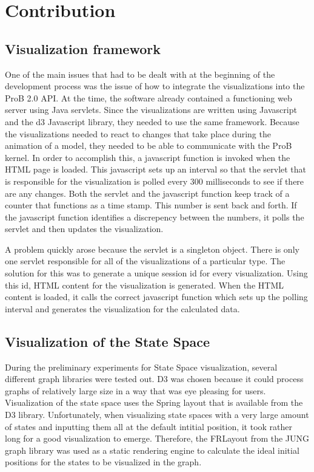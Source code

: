 \section{Contribution}

\subsection{Visualization framework}

One of the main issues that had to be dealt with at the beginning of the development process was the issue of how to integrate the visualizations into the ProB 2.0 API. At the time, the software already contained a functioning web server using Java servlets. Since the visualizations are written using Javascript and the d3 Javascript library, they needed to use the same framework. Because the visualizations needed to react to changes that take place during the animation of a model, they needed to be able to communicate with the ProB kernel. In order to accomplish this, a javascript function is invoked when the HTML page is loaded. This javascript sets up an interval so that the servlet that is responsible for the visualization is polled every 300 milliseconds to see if there are any changes. Both the servlet and the javascript function keep track of a counter that functions as a time stamp. This number is sent back and forth. If the javascript function identifies a discrepency between the numbers, it polls the servlet and then updates the visualization.

A problem quickly arose because the servlet is a singleton object. There is only one servlet responsible for all of the visualizations of a particular type. The solution for this was to generate a unique session id for every visualization. Using this id, HTML content for the visualization is generated. When the HTML content is loaded, it calls the correct javascript function which sets up the polling interval and generates the visualization for the calculated data.

\subsection{Visualization of the State Space}

During the preliminary experiments for State Space visualization, several different graph libraries were tested out. D3 was chosen because it could process graphs of relatively large size in a way that was eye pleasing for users. Visualization of the state space uses the Spring layout that is available from the D3 library. Unfortunately, when visualizing state spaces with a very large amount of states and inputting them all at the default intitial position, it took rather long for a good visualization to emerge. Therefore, the FRLayout from the JUNG graph library was used as a static rendering engine to calculate the ideal initial positions for the states to be visualized in the graph.

